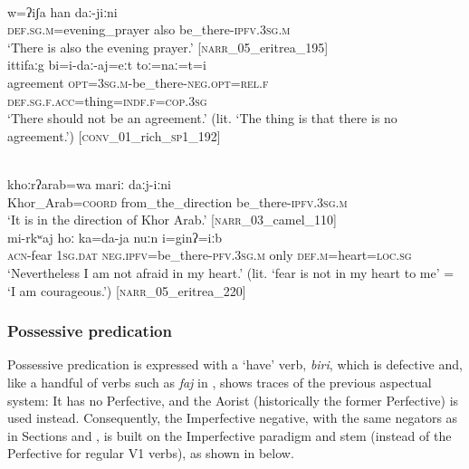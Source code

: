 \documentclass[output=paper,colorlinks,citecolor=brown]{langscibook}
\begin{document}
\ea\label{ex:beja:19}
\\
    \gll w=ʔiʃa han daː-jiːni \\
        \textsc{def.sg.m}=evening\_prayer also be\_there-\textsc{ipfv.3sg.m} \\
    \glt ‘There is also the evening prayer.’ [\textsc{narr}\_05\_eritrea\_195]
\newpage
{}\\
    \gll ittifaːg bi=i-daː-aj=eːt toː=naː=t=i\\
         agreement \textsc{opt=3sg.m}{}-be\_there-\textsc{neg.opt=rel.f} \textsc{def.sg.f.acc}=thing=\textsc{indf.f=cop.3sg}\\
    \glt `There should not be an agreement.' (lit. `The thing is that there is no agreement.') [\textsc{conv}\_01\_rich\_\textsc{sp1}\_192]
\z  \z

\ea\label{ex:beja:20}
\\
    \gll khoːrʔarab=wa mariː daːj-iːni \\
        Khor\_Arab=\textsc{coord} from\_the\_direction be\_there-\textsc{ipfv.3sg.m} \\
    \glt ‘It is in the direction of Khor Arab.’ [\textsc{narr}\_03\_camel\_110]
\\
    \gll mi-rkʷaj hoː ka=da-ja nuːn i=ginʔ=iːb\\
        \textsc{acn}-fear \textsc{1sg.dat} \textsc{neg.ipfv}=be\_there-\textsc{pfv.3sg.m} only \textsc{def.m}=heart=\textsc{loc.sg} \\
    \glt `Nevertheless I am not afraid in my heart.' (lit. `fear is not in my heart to me' = `I am courageous.') [\textsc{narr}\_05\_eritrea\_220]
\z \z 

\subsubsection{Possessive predication}

Possessive predication is expressed with a ‘have’ verb, \textit{biri}, which is defective and, like a handful of verbs such as \textit{faj} in , shows traces of the previous aspectual system: It has no Perfective, and the Aorist (historically the former Perfective) is used instead. Consequently, the Imperfective negative, with the same negators as in Sections  and , is built on the Imperfective paradigm and stem (instead of the Perfective for regular V1 verbs), as shown in  below.
\end{document}
